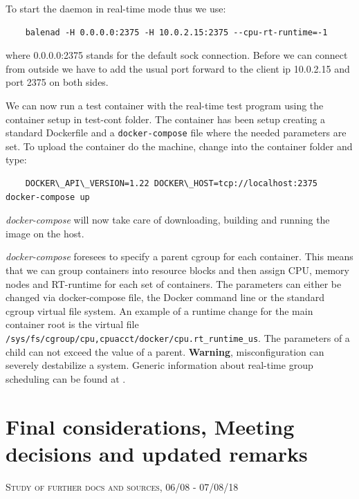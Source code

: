 \documentclass[]{scrartcl}
\begin{document}
To start the daemon in real-time mode thus we use:

\begin{verbatim}
	balenad -H 0.0.0.0:2375 -H 10.0.2.15:2375 --cpu-rt-runtime=-1
\end{verbatim}

where 0.0.0.0:2375 stands for the default sock connection. Before we can connect from outside we have to add the usual port forward to the client ip 10.0.2.15 and port 2375 on both sides.

We can now run a test container with the real-time test program using the container setup in test-cont folder. The container has been setup creating a standard Dockerfile and a \texttt{docker-compose} file where the needed parameters are set. To upload the container do the machine, change into the container folder and type:

\begin{verbatim}
	DOCKER\_API\_VERSION=1.22 DOCKER\_HOST=tcp://localhost:2375 docker-compose up
\end{verbatim}

\textit{docker-compose} will now take care of downloading, building and running the image on the host.

\textit{docker-compose} foresees to specify a parent cgroup for each container. This means that we can group containers into resource blocks and then assign CPU, memory nodes and RT-runtime for each set of containers. The parameters can either be changed via docker-compose file, the Docker command line or the standard cgroup virtual file system. An example of a runtime change for the main container root is the virtual file \texttt{/sys/fs/cgroup/cpu,cpuacct/docker/cpu.rt\_runtime\_us}. The parameters of a child can not exceed the value of a parent. \textbf{Warning}, misconfiguration can severely destabilize a system. Generic information about real-time group scheduling can be found at \cite{kernel01}.

\section{Final considerations, Meeting decisions and updated remarks}

{\small\textsc{Study of further docs and sources, 06/08 - 07/08/18} \bigskip}
\end{document}
